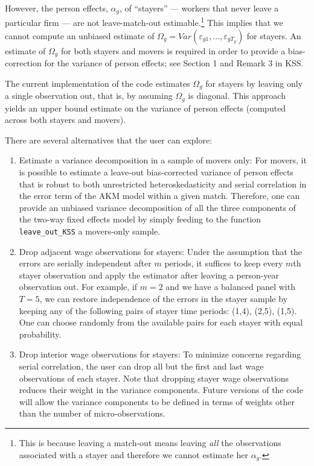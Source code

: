 \documentclass[11pt]{article}
\begin{document}
However, the person effects, \(\alpha_{g}\), of ``stayers'' --- workers
that never leave a particular firm --- are not leave-match-out
estimable.\footnote{This is because leaving a match-out means leaving \textit{all} the observations associated with a stayer and therefore we cannot estimate her $\alpha_{g}$.} This implies that we cannot compute an unbiased estimate of
\(\Omega_{g}=Var(\varepsilon_{g1},...,\varepsilon_{gT_{g}})\) for
stayers. An estimate of \(\Omega_{g}\) for both stayers and movers is
required in order to provide a bias-correction for the variance of
person effects; see Section 1 and Remark 3 in KSS.

The current implementation of the code estimates 
$\Omega_{g}$ for stayers by leaving only a single observation out, that is, by assuming $\Omega_g$ is diagonal. This approach yields an upper bound estimate on
the variance of person effects (computed across both stayers and
movers).

There are several alternatives that the user can explore:

\begin{enumerate}
\def\labelenumi{\arabic{enumi}.}
\item
  Estimate a variance decomposition in a sample of movers only: For
  movers, it is possible to estimate a leave-out bias-corrected variance
  of person effects that is robust to both unrestricted
  heteroskedasticity and serial correlation in the error term of the AKM
  model within a given match. Therefore, one can provide an unbiased
  variance decomposition of all the three components of the two-way
  fixed effects model by simply feeding to the function
  \texttt{leave\_out\_KSS} a movers-only sample.
\item
  Drop adjacent wage observations for stayers: Under the assumption that
  the errors are serially independent after $m$ periods, it suffices to
  keep every $m$th stayer observation and apply the 
  estimator after leaving a person-year observation out. For example, if \(m=2\) and we have a balanced panel
  with \(T=5\), we can restore independence of the errors in the stayer
  sample by keeping any of the following pairs of stayer time periods:
  (1,4), (2,5), (1,5). One can choose randomly from the available pairs
  for each stayer with equal probability.
 \item 
  Drop interior wage observations for stayers:  To minimize concerns regarding serial correlation, the user can drop all but the first and last wage observations of each stayer. Note that dropping stayer wage observations reduces their weight in the variance components. Future versions of the code will allow the variance components to be defined in terms of weights other than the number of micro-observations.
\end{enumerate}
\end{document}
